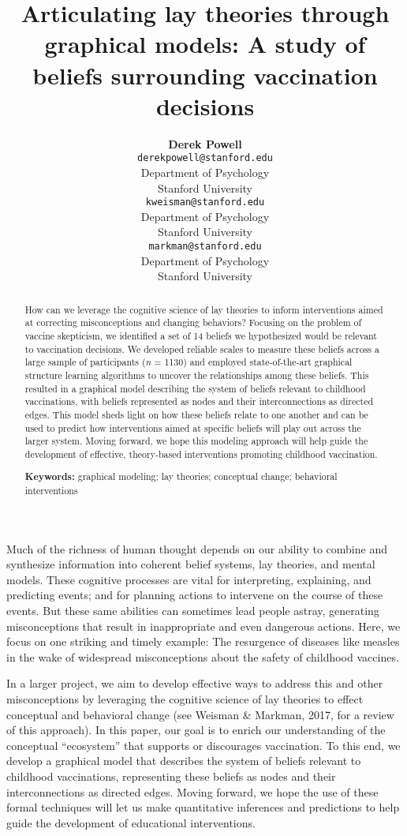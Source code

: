 \documentclass[10pt, letterpaper]{article}
\title{Articulating lay theories through graphical models: A study of beliefs
surrounding vaccination decisions}
\author{{\large \bf Derek Powell} \\ \texttt{derekpowell@stanford.edu} \\ Department of Psychology \\ Stanford University \And {\large \bf Kara Weisman} \\ \texttt{kweisman@stanford.edu} \\ Department of Psychology \\ Stanford University \And {\large \bf Ellen M. Markman} \\ \texttt{markman@stanford.edu} \\ Department of Psychology \\ Stanford University}
\begin{document}
\maketitle

\begin{abstract}
How can we leverage the cognitive science of lay theories to inform
interventions aimed at correcting misconceptions and changing behaviors?
Focusing on the problem of vaccine skepticism, we identified a set of 14
beliefs we hypothesized would be relevant to vaccination decisions. We
developed reliable scales to measure these beliefs across a large sample
of participants (\emph{n} = 1130) and employed state-of-the-art
graphical structure learning algorithms to uncover the relationships
among these beliefs. This resulted in a graphical model describing the
system of beliefs relevant to childhood vaccinations, with beliefs
represented as nodes and their interconnections as directed edges. This
model sheds light on how these beliefs relate to one another and can be
used to predict how interventions aimed at specific beliefs will play
out across the larger system. Moving forward, we hope this modeling
approach will help guide the development of effective, theory-based
interventions promoting childhood vaccination.

\textbf{Keywords:}
graphical modeling; lay theories; conceptual change; behavioral
interventions
\end{abstract}

Much of the richness of human thought depends on our ability to combine
and synthesize information into coherent belief systems, lay theories,
and mental models. These cognitive processes are vital for interpreting,
explaining, and predicting events; and for planning actions to intervene
on the course of these events. But these same abilities can sometimes
lead people astray, generating misconceptions that result in
inappropriate and even dangerous actions. Here, we focus on one striking
and timely example: The resurgence of diseases like measles in the wake
of widespread misconceptions about the safety of childhood vaccines.

In a larger project, we aim to develop effective ways to address this
and other misconceptions by leveraging the cognitive science of lay
theories to effect conceptual and behavioral change (see Weisman \&
Markman, 2017, for a review of this approach). In this paper, our goal
is to enrich our understanding of the conceptual ``ecosystem'' that
supports or discourages vaccination. To this end, we develop a graphical
model that describes the system of beliefs relevant to childhood
vaccinations, representing these beliefs as nodes and their
interconnections as directed edges. Moving forward, we hope the use of
these formal techniques will let us make quantitative inferences and
predictions to help guide the development of educational interventions.
\end{document}
